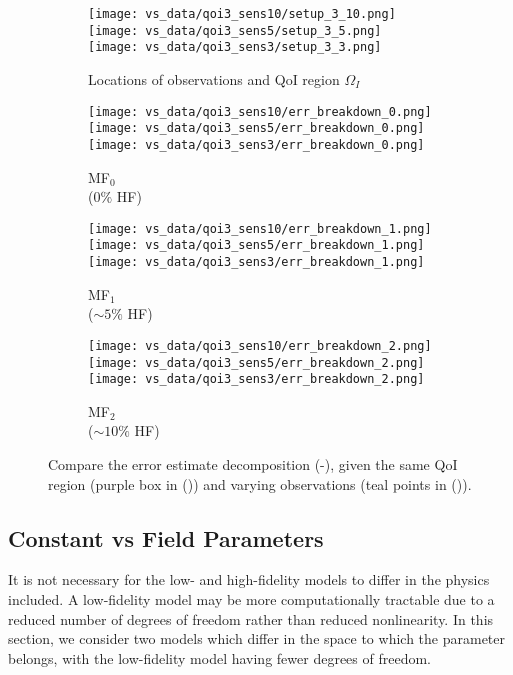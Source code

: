 \begin{figure}[h]
\captionsetup[subfigure]{justification=centering}
\centering
  \begin{subfigure}[t]{0.20\textwidth}
  \centering
    \texttt{[image: vs\_data/qoi3\_sens10/setup\_3\_10.png]}
    \texttt{[image: vs\_data/qoi3\_sens5/setup\_3\_5.png]}
    \texttt{[image: vs\_data/qoi3\_sens3/setup\_3\_3.png]}
    \caption{Locations of observations and QoI region $\Omega_I$}
    \label{subfig:obsSetup2}
  \end{subfigure}
  \begin{subfigure}[t]{0.20\textwidth}
  \centering
    \texttt{[image: vs\_data/qoi3\_sens10/err\_breakdown\_0.png]}
    \texttt{[image: vs\_data/qoi3\_sens5/err\_breakdown\_0.png]}
    \texttt{[image: vs\_data/qoi3\_sens3/err\_breakdown\_0.png]}
    \caption{MF$_0$ \\ ($0\%$ HF)}
    \label{subfig:obsLF2}
  \end{subfigure}
  \begin{subfigure}[t]{0.20\textwidth}
  \centering
    \texttt{[image: vs\_data/qoi3\_sens10/err\_breakdown\_1.png]}
    \texttt{[image: vs\_data/qoi3\_sens5/err\_breakdown\_1.png]}
    \texttt{[image: vs\_data/qoi3\_sens3/err\_breakdown\_1.png]}
    \caption{MF$_1$ \\ ($\sim5\%$ HF)}
  \end{subfigure}
  \begin{subfigure}[t]{0.20\textwidth}
  \centering
    \texttt{[image: vs\_data/qoi3\_sens10/err\_breakdown\_2.png]}
    \texttt{[image: vs\_data/qoi3\_sens5/err\_breakdown\_2.png]}
    \texttt{[image: vs\_data/qoi3\_sens3/err\_breakdown\_2.png]}
    \caption{MF$_2$ \\ ($\sim10\%$ HF)}
    \label{subfig:obsMFlast2}
  \end{subfigure}
  \caption{Compare the error estimate decomposition (-), given the same QoI region (purple box in ()) and varying observations (teal points in ()).}
  \label{fig:dataStudy}
\end{figure}

\subsection{Constant vs Field Parameters} \label{sec:constvfield}
It is not necessary for the low- and high-fidelity models to differ in the physics included. A low-fidelity model may be more computationally tractable due to a reduced number of degrees of freedom rather than reduced nonlinearity. In this section, we consider two models which differ in the space to which the parameter belongs, with the low-fidelity model having fewer degrees of freedom.
